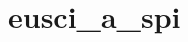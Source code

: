\hypertarget{group__eusci__a__spi__api}{}\section{eusci\+\_\+a\+\_\+spi}
\label{group__eusci__a__spi__api}
